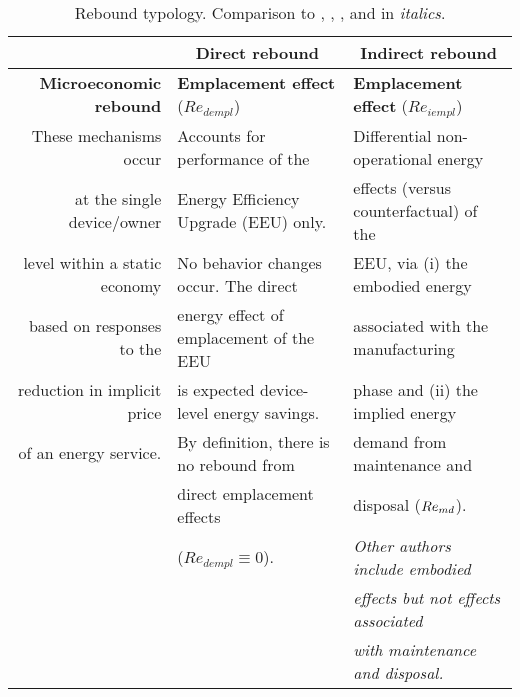 


\begin{table}
\footnotesize
\begin{center}
\caption{Rebound typology. Comparison to \citet{Sorrell:2009cg}, \citet{Jenkins2011}, 
                           \citet{Thomas:2013aa,Thomas:2013ab}, and \citet{Walnum2014} in \emph{italics}.}
\label{tab:rebound_typology}
\begin{tabular}{ r l l }
\toprule
                                   & \multicolumn{1}{c}{\textbf{Direct rebound}} & \multicolumn{1}{c}{\textbf{Indirect rebound}} \\
\midrule
\textbf{Microeconomic rebound}     & \textbf{Emplacement effect} ($Re_{dempl}$)  & \textbf{Emplacement effect} ($Re_{iempl}$) \\
These mechanisms occur             & Accounts for performance of the             & Differential non-operational energy  \\
at the single device/owner         & Energy Efficiency Upgrade (EEU) only.       & effects (versus counterfactual) of the  \\
level within a static economy      & No behavior changes occur. The direct       & EEU, via (i) the embodied energy  \\
based on responses to the          & energy effect of emplacement of the EEU     & associated with the manufacturing  \\
reduction in implicit price        & is expected device-level energy savings.    & phase and (ii) the implied energy \\
of an energy service.              & By definition, there is no rebound from     & demand from maintenance and  \\
                                   & direct emplacement effects                  & disposal ($Re_{md}$).  \\
                                   & ($Re_{dempl} \equiv 0$).                    & \emph{Other authors include embodied}  \\
                                   &                                             & \emph{effects but not effects associated} \\
                                   &                                             & \emph{with maintenance and disposal.} \\

\end{tabular}
\end{center}
\end{table}
